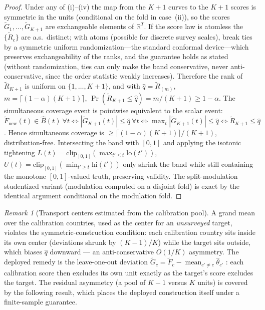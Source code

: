 \documentclass[12pt]{article}
\theoremstyle{definition}
\theoremstyle{remark}
\newtheorem{remark}{Remark}
\newcommand{\Ftilde}{\widetilde{F}}
\newcommand{\Gtilde}{\widetilde{G}}
\begin{document}
\begin{proof}
Under any of (i)--(iv) the map from the $K{+}1$ curves to the $K{+}1$ scores is
symmetric in the units (conditional on the fold in case~(ii)), so the scores
$\Gtilde_1,\dots,\Gtilde_{K+1}$ are exchangeable elements of $\mathbb R^T$. If the score law is
atomless the $\{\widetilde R_c\}$ are a.s.\ distinct; with atoms (possible for discrete
survey scales), break ties by a symmetric uniform randomization---the standard
conformal device---which preserves exchangeability of the ranks, and the guarantee
holds as stated (without randomization, ties can only make the band conservative,
never anti-conservative, since the order statistic weakly increases). Therefore the rank of $\widetilde R_{K+1}$ is uniform on
$\{1,\dots,K{+}1\}$, and with $\widehat q=\widetilde R_{(m)}$, $m=\lceil(1-\alpha)(K{+}1)\rceil$,
$\Pr(\widetilde R_{K+1}\le\widehat q)=m/(K{+}1)\ge1-\alpha$. The simultaneous coverage event is
pointwise equivalent to the scalar event:
$\Ftilde_{\text{new}}(t)\in\widehat B(t)\ \forall t\iff|\Gtilde_{K+1}(t)|\le\widehat q\ \forall t\iff
\max_t|\Gtilde_{K+1}(t)|\le\widehat q\iff \widetilde R_{K+1}\le\widehat q$. Hence simultaneous coverage is
$\ge\lceil(1-\alpha)(K{+}1)\rceil/(K{+}1)$, distribution-free. Intersecting the band with
$[0,1]$ and applying the isotonic tightening $L(t)=\mathrm{clip}_{[0,1]}(\max_{t'\le t}
\mathrm{lo}(t'))$, $U(t)=\mathrm{clip}_{[0,1]}(\min_{t'\ge t}\mathrm{hi}(t'))$ only shrink
the band while still containing the monotone $[0,1]$-valued truth, preserving validity.
The split-modulation studentized variant (modulation computed on a disjoint fold) is
exact by the identical argument conditional on the modulation fold.
\end{proof}

\begin{remark}[Transport centers estimated from the calibration pool]\label{rem:center}
A grand mean over the calibration countries, used as the center for an
\emph{unsurveyed} target, violates the symmetric-construction condition: each
calibration country sits inside its own center (deviations shrunk by $(K{-}1)/K$) while
the target sits outside, which biases $\widehat q$ downward --- an anti-conservative
$O(1/K)$ asymmetry. The deployed remedy is the leave-one-out deviation
$\Gtilde_c=\Ftilde_c-\operatorname{mean}_{c'\ne c}\widehat\theta_{c'}$
: each calibration score then
excludes its own unit exactly as the target's score excludes the target. The residual
asymmetry (a pool of $K{-}1$ versus $K$ units) is covered by the following
result, which places the deployed construction itself under a finite-sample
guarantee.
\end{remark}
\end{document}
